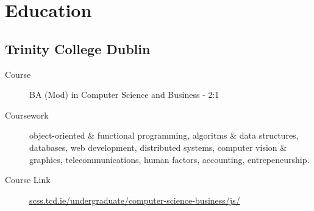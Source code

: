 \section*{Education}

\subsection*{Trinity College Dublin}
\begin{description}
  \item[Course] BA (Mod) in Computer Science and Business - 2:1
  \item[Coursework] object-oriented \& functional programming, algoritms \& data structures, databases, web development, distributed systems, computer vision \& graphics, telecommunications, human factors, accounting, entrepeneurship.
  \item[Course Link] \href{https://www.scss.tcd.ie/undergraduate/computer-science-business/js/}{scss.tcd.ie/undergraduate/computer-science-business/js/}
\end{description}
